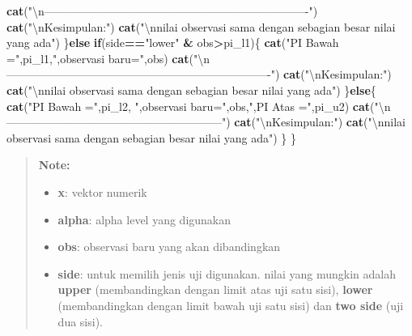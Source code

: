 \documentclass[]{book}
\newenvironment{Shaded}{\begin{snugshade}}{\end{snugshade}}
\newcommand{\KeywordTok}[1]{\textcolor[rgb]{0.13,0.29,0.53}{\textbf{#1}}}
\newcommand{\CharTok}[1]{\textcolor[rgb]{0.31,0.60,0.02}{#1}}
\newcommand{\StringTok}[1]{\textcolor[rgb]{0.31,0.60,0.02}{#1}}
\newcommand{\ControlFlowTok}[1]{\textcolor[rgb]{0.13,0.29,0.53}{\textbf{#1}}}
\newcommand{\OperatorTok}[1]{\textcolor[rgb]{0.81,0.36,0.00}{\textbf{#1}}}
\newcommand{\NormalTok}[1]{#1}
\providecommand{\tightlist}{%
  \setlength{\itemsep}{0pt}\setlength{\parskip}{0pt}}
\begin{document}
\begin{Shaded}
\begin{Highlighting}[]
    \KeywordTok{cat}\NormalTok{(}\StringTok{"}\CharTok{\textbackslash{}n}\StringTok{----------------------------------------------------------------------"}\NormalTok{)}
    \KeywordTok{cat}\NormalTok{(}\StringTok{"}\CharTok{\textbackslash{}n}\StringTok{Kesimpulan:"}\NormalTok{)}
    \KeywordTok{cat}\NormalTok{(}\StringTok{"}\CharTok{\textbackslash{}n}\StringTok{nilai observasi sama dengan sebagian besar nilai yang ada"}\NormalTok{)}
\NormalTok{  \}}\ControlFlowTok{else} \ControlFlowTok{if}\NormalTok{(side}\OperatorTok{==}\StringTok{"lower"} \OperatorTok{&}\StringTok{ }\NormalTok{obs}\OperatorTok{>}\NormalTok{pi_l1)\{}
    \KeywordTok{cat}\NormalTok{(}\StringTok{"PI Bawah ="}\NormalTok{,pi_l1,}\StringTok{",observasi baru="}\NormalTok{,obs)}
    \KeywordTok{cat}\NormalTok{(}\StringTok{"}\CharTok{\textbackslash{}n}\StringTok{----------------------------------------------------------------------"}\NormalTok{)}
    \KeywordTok{cat}\NormalTok{(}\StringTok{"}\CharTok{\textbackslash{}n}\StringTok{Kesimpulan:"}\NormalTok{)}
    \KeywordTok{cat}\NormalTok{(}\StringTok{"}\CharTok{\textbackslash{}n}\StringTok{nilai observasi sama dengan sebagian besar nilai yang ada"}\NormalTok{)}
\NormalTok{  \}}\ControlFlowTok{else}\NormalTok{\{}
    \KeywordTok{cat}\NormalTok{(}\StringTok{"PI Bawah ="}\NormalTok{,pi_l2, }\StringTok{",observasi baru="}\NormalTok{,obs,}\StringTok{",PI Atas ="}\NormalTok{,pi_u2)}
    \KeywordTok{cat}\NormalTok{(}\StringTok{"}\CharTok{\textbackslash{}n}\StringTok{---------------------------------------------------------"}\NormalTok{)}
    \KeywordTok{cat}\NormalTok{(}\StringTok{"}\CharTok{\textbackslash{}n}\StringTok{Kesimpulan:"}\NormalTok{)}
    \KeywordTok{cat}\NormalTok{(}\StringTok{"}\CharTok{\textbackslash{}n}\StringTok{nilai observasi sama dengan sebagian besar nilai yang ada"}\NormalTok{)}
\NormalTok{  \}}
\NormalTok{\}}
\end{Highlighting}
\end{Shaded}

\begin{quote}
\textbf{Note: }

\begin{itemize}
\tightlist
\item
  \textbf{x}: vektor numerik
\item
  \textbf{alpha}: alpha level yang digunakan
\item
  \textbf{obs}: observasi baru yang akan dibandingkan
\item
  \textbf{side}: untuk memilih jenis uji digunakan. nilai yang mungkin
  adalah \textbf{upper} (membandingkan dengan limit atas uji satu sisi),
  \textbf{lower} (membandingkan dengan limit bawah uji satu sisi) dan
  \textbf{two side} (uji dua sisi).
\end{itemize}
\end{quote}
\end{document}
